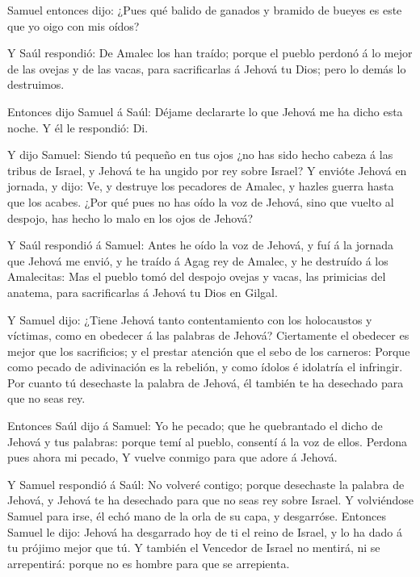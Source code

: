  Samuel entonces dijo: ¿Pues qué balido de ganados y
bramido de bueyes es este que yo oigo con mis oídos?

 Y Saúl respondió: De Amalec los han traído; porque el
pueblo perdonó á lo mejor de las ovejas y de las vacas, para
sacrificarlas á Jehová tu Dios; pero lo demás lo destruimos.

 Entonces dijo Samuel á Saúl: Déjame declararte lo que
Jehová me ha dicho esta noche. Y él le respondió: Di.

 Y dijo Samuel: Siendo tú pequeño en tus ojos ¿no has sido
hecho cabeza á las tribus de Israel, y Jehová te ha ungido por rey sobre
Israel?  Y envióte Jehová en jornada, y dijo: Ve, y
destruye los pecadores de Amalec, y hazles guerra hasta que los acabes.
 ¿Por qué pues no has oído la voz de Jehová, sino que
vuelto al despojo, has hecho lo malo en los ojos de Jehová?

 Y Saúl respondió á Samuel: Antes he oído la voz de Jehová,
y fuí á la jornada que Jehová me envió, y he traído á Agag rey de
Amalec, y he destruído á los Amalecitas:  Mas el pueblo
tomó del despojo ovejas y vacas, las primicias del anatema, para
sacrificarlas á Jehová tu Dios en Gilgal.

 Y Samuel dijo: ¿Tiene Jehová tanto contentamiento con los
holocaustos y víctimas, como en obedecer á las palabras de Jehová?
Ciertamente el obedecer es mejor que los sacrificios; y el prestar
atención que el sebo de los carneros:  Porque como pecado
de adivinación es la rebelión, y como ídolos é idolatría el infringir.
Por cuanto tú desechaste la palabra de Jehová, él también te ha
desechado para que no seas rey.

 Entonces Saúl dijo á Samuel: Yo he pecado; que he
quebrantado el dicho de Jehová y tus palabras: porque temí al pueblo,
consentí á la voz de ellos. Perdona pues ahora mi pecado, 
Y vuelve conmigo para que adore á Jehová.

 Y Samuel respondió á Saúl: No volveré contigo; porque
desechaste la palabra de Jehová, y Jehová te ha desechado para que no
seas rey sobre Israel.  Y volviéndose Samuel para irse, él
echó mano de la orla de su capa, y desgarróse.  Entonces
Samuel le dijo: Jehová ha desgarrado hoy de ti el reino de Israel, y lo
ha dado á tu prójimo mejor que tú.  Y también el Vencedor
de Israel no mentirá, ni se arrepentirá: porque no es hombre para que se
arrepienta.

